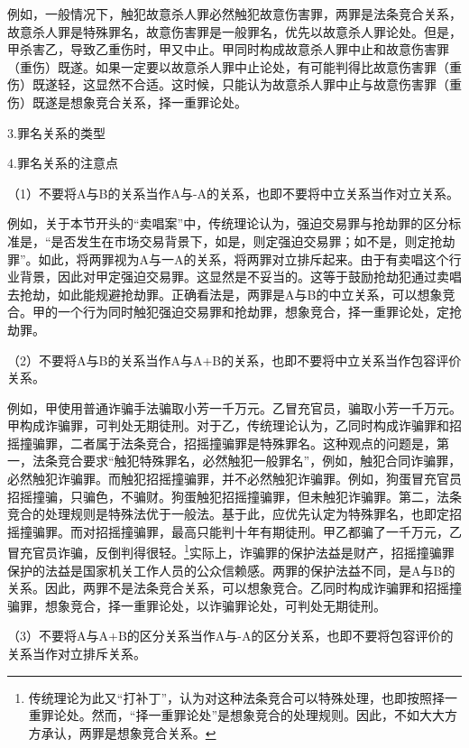 例如，一般情况下，触犯故意杀人罪必然触犯故意伤害罪，两罪是法条竞合关系，故意杀人罪是特殊罪名，故意伤害罪是一般罪名，优先以故意杀人罪论处。但是，甲杀害乙，导致乙重伤时，甲又中止。甲同时构成故意杀人罪中止和故意伤害罪（重伤）既遂。如果一定要以故意杀人罪中止论处，有可能判得比故意伤害罪（重伤）既遂轻，这显然不合适。这时候，只能认为故意杀人罪中止与故意伤害罪（重伤）既遂是想象竞合关系，择一重罪论处。

3.罪名关系的类型


4.罪名关系的注意点

（1）不要将A与B的关系当作A与-A的关系，也即不要将中立关系当作对立关系。

例如，关于本节开头的“卖唱案”中，传统理论认为，强迫交易罪与抢劫罪的区分标准是，“是否发生在市场交易背景下，如是，则定强迫交易罪；如不是，则定抢劫罪”。如此，将两罪视为A与一A的关系，将两罪对立排斥起来。由于有卖唱这个行业背景，因此对甲定强迫交易罪。这显然是不妥当的。这等于鼓励抢劫犯通过卖唱去抢劫，如此能规避抢劫罪。正确看法是，两罪是A与B的中立关系，可以想象竞合。甲的一个行为同时触犯强迫交易罪和抢劫罪，想象竞合，择一重罪论处，定抢劫罪。

（2）不要将A与B的关系当作A与A+B的关系，也即不要将中立关系当作包容评价关系。

例如，甲使用普通诈骗手法骗取小芳一千万元。乙冒充官员，骗取小芳一千万元。甲构成诈骗罪，可判处无期徒刑。对于乙，传统理论认为，乙同时构成诈骗罪和招摇撞骗罪，二者属于法条竞合，招摇撞骗罪是特殊罪名。这种观点的问题是，第一，法条竞合要求“触犯特殊罪名，必然触犯一般罪名”，例如，触犯合同诈骗罪，必然触犯诈骗罪。而触犯招摇撞骗罪，并不必然触犯诈骗罪。例如，狗蛋冒充官员招摇撞骗，只骗色，不骗财。狗蛋触犯招摇撞骗罪，但未触犯诈骗罪。第二，法条竞合的处理规则是特殊法优于一般法。基于此，应优先认定为特殊罪名，也即定招摇撞骗罪。而对招摇撞骗罪，最高只能判十年有期徒刑。甲乙都骗了一千万元，乙冒充官员诈骗，反倒判得很轻。\footnote{传统理论为此又“打补丁”，认为对这种法条竞合可以特殊处理，也即按照择一重罪论处。然而，“择一重罪论处”是想象竞合的处理规则。因此，不如大大方方承认，两罪是想象竞合关系。}实际上，诈骗罪的保护法益是财产，招摇撞骗罪保护的法益是国家机关工作人员的公众信赖感。两罪的保护法益不同，是A与B的关系。因此，两罪不是法条竞合关系，可以想象竞合。乙同时构成诈骗罪和招摇撞骗罪，想象竞合，择一重罪论处，以诈骗罪论处，可判处无期徒刑。

（3）不要将A与A+B的区分关系当作A与-A的区分关系，也即不要将包容评价的关系当作对立排斥关系。

